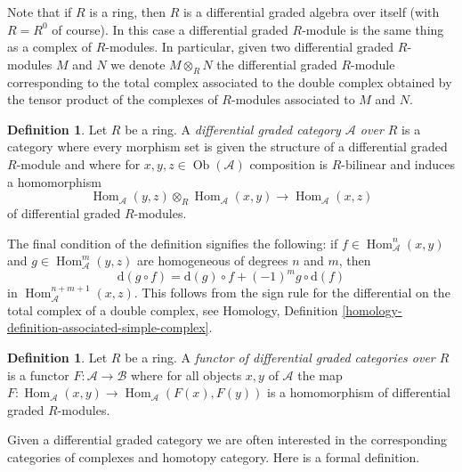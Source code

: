 \documentclass{stacks-project}
\theoremstyle{plain}
\theoremstyle{definition}
\newtheorem{definition}[subsection]{Definition}
\theoremstyle{remark}
\numberwithin{equation}{subsection}
\def\Hom{\mathop{\mathrm{Hom}}\nolimits}
\def\Ob{\mathop{\mathrm{Ob}}\nolimits}
\begin{document}
\noindent
Note that if $R$ is a ring, then $R$ is a differential graded algebra
over itself (with $R = R^0$ of course). In this case a differential
graded $R$-module is the same thing as a complex of $R$-modules.
In particular, given two differential graded $R$-modules $M$ and $N$
we denote $M \otimes_R N$ the differential graded $R$-module
corresponding to the total complex associated to the double
complex obtained by the tensor product of the complexes of $R$-modules
associated to $M$ and $N$.

\begin{definition}
\label{definition-dga-category}
Let $R$ be a ring. A {\it differential graded category $\mathcal{A}$
over $R$} is a category where every morphism set is given the structure
of a differential graded $R$-module and where for
$x, y, z \in \Ob(\mathcal{A})$ composition is $R$-bilinear and induces
a homomorphism
$$
\Hom_\mathcal{A}(y, z) \otimes_R \Hom_\mathcal{A}(x, y)
\longrightarrow
\Hom_\mathcal{A}(x, z)
$$
of differential graded $R$-modules.
\end{definition}

\noindent
The final condition of the definition signifies the following:
if $f \in \Hom_\mathcal{A}^n(x, y)$ and
$g \in \Hom_\mathcal{A}^m(y, z)$ are homogeneous
of degrees $n$ and $m$, then
$$
\text{d}(g \circ f) = \text{d}(g) \circ f + (-1)^mg \circ \text{d}(f)
$$
in $\Hom_\mathcal{A}^{n + m + 1}(x, z)$. This follows from the sign
rule for the differential on the total complex of a double complex, see
Homology, Definition \ref{homology-definition-associated-simple-complex}.

\begin{definition}
\label{definition-functor-dga-categories}
Let $R$ be a ring. A {\it functor of differential graded categories over $R$}
is a functor $F : \mathcal{A} \to \mathcal{B}$ where for all objects
$x, y$ of $\mathcal{A}$ the map
$F : \Hom_\mathcal{A}(x, y) \to \Hom_\mathcal{A}(F(x), F(y))$
is a homomorphism of differential graded $R$-modules.
\end{definition}

\noindent
Given a differential graded category we are often interested in the
corresponding categories of complexes and homotopy category.
Here is a formal definition.
\end{document}
